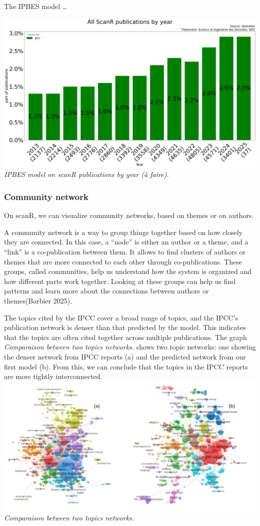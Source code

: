 \documentclass[
]{article}
\begin{document}
The IPBES model \ldots{}

\includegraphics{./images/teds_model_scanR1.png} \emph{IPBES model on
scanR publications by year (à faire).}

\hypertarget{community-network}{%
\subsubsection{Community network}\label{community-network}}

On scanR, we can visualize community networks, based on themes or on
authors.

A community network is a way to group things together based on how
closely they are connected. In this case, a ``node'' is either an author
or a theme, and a ``link'' is a co-publication between them. It allows
to find clusters of authors or themes that are more connected to each
other through co-publications. These groups, called communities, help us
understand how the system is organized and how different parts work
together. Looking at these groups can help us find patterns and learn
more about the connections between authors or themes(Barbier 2025).

The topics cited by the IPCC cover a broad range of topics, and the
IPCC's publication network is denser than that predicted by the model.
This indicates that the topics are often cited together across multiple
publications. The graph \emph{Comparaison between two topics networks.}
shows two topic networks: one showing the denser network from IPCC
reports (a) and the predicted network from our first model (b). From
this, we can conclude that the topics in the IPCC reports are more
tightly interconnected.
\includegraphics{./images/teds_network_topics2.png} \emph{Comparaison
between two topics networks.}
\end{document}
